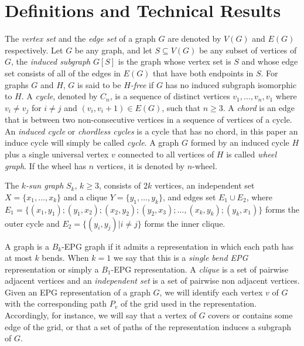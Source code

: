 \documentclass[9pt]{entcs}
\begin{document}
\section{Definitions and Technical Results}

The \textit{vertex set} and the \textit{edge set} of a graph $G$ are denoted by $V(G)$ and $E(G)$ respectively. 
Let $G$ be any graph, and let $S \subseteq V(G)$ be any subset of vertices of $G$, the \textit{induced subgraph} $G[S]$ is the graph whose vertex set is $S$ and whose edge set consists of all of the edges in $E(G)$ that have both endpoints in $S$.
 For graphs $G$ and $H$, $G$ is said to be \textit{$H$-free} if $G$ has no induced subgraph isomorphic to $H$. A \textit{cycle},  denoted by $C_n$,  is a sequence of distinct
vertices $v_1, \dots , v_n, v_1$  where $v_i \neq v_j$ for $i \neq j$ and $(v_i, v_i + 1) \in E(G)$, such that
$n \geq 3$. A \textit{chord} is an edge that is between two non-consecutive vertices in a sequence of vertices of a cycle. An \textit{induced cycle}  or \textit{chordless cycles} is a cycle that has no chord, in this paper an induce cycle will simply be called  \textit{cycle}. A graph $G$ formed by an induced cycle $H$ plus  a single universal vertex $v$ connected to all vertices of $H$
is called \textit{wheel graph}. If the wheel has $n$ vertices, it is denoted by $n$-wheel. 

The $k$\textit{-sun graph }$S_k$, $k \geq 3$, consists of
$2k$ vertices, an independent set $X = \{x_1, \dots, x_k\}$ and a clique $Y = \{y_1, \dots, y_k\}$, and edges set $E_1 \cup E_2$, where $E_ 1=\{ (x_1,y_1); (y_1, x_2); (x_2, y_2); (y_2, x_3); \dots , (x_k, y_k); (y_k, x_1) \}$ forms the outer cycle and $E_2= \{(y_i, y_j) |i\neq j\}$ forms the inner clique.

A graph is a $ B_k$-EPG graph if it admits a representation in which each path has at most $k$ bends.  When $ k = 1 $ we say that this is a \emph{single bend EPG} representation or simply a $B_1$-EPG representation.
A \textit{clique} is a set of pairwise adjacent vertices and
an \textit{independent set} is a set of pairwise non adjacent vertices.
Given an EPG representation of a graph $G$, we will identify each vertex $v$ of $G$ with the corresponding path $P_{v}$ of the grid used in the representation. Accordingly, for instance, we will say that a vertex of $G$ covers or contains some edge of the grid, or that a set of paths of the representation induces a subgraph of $G$. 
\end{document}
